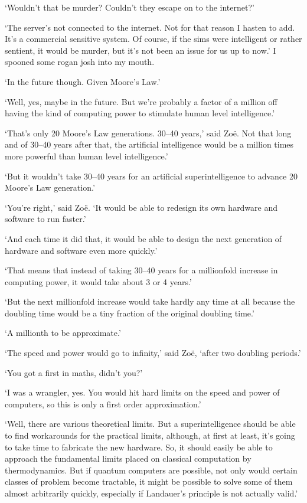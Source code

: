 `Wouldn't that be murder? Couldn't they escape on to the
internet?'

`The server's not connected to the internet. Not for that reason I
hasten to add. It's a commercial sensitive system. Of course, if the
sims were intelligent or rather sentient, it would be murder, but
it's not been an issue for us up to now.' I spooned some rogan josh
into my mouth.

`In the future though. Given Moore's Law.'

`Well, yes, maybe in the future. But we're probably a factor of a
million off having the kind of computing power to stimulate human
level intelligence.'

`That's only 20 Moore's Law generations.
30--40 years,' said Zoë. Not that long and of 30--40 years
after that, the artificial intelligence would be a million times
more powerful than human level intelligence.'

`But it wouldn't take 30--40 years for an artificial
superintelligence to advance 20 Moore's Law generation.'

`You're right,' said Zoë. `It would be able to redesign its
own hardware and software to run faster.'

`And each time it did that, it would be able to design the next
generation of hardware and software even more quickly.'

`That means that instead of taking 30--40 years for a millionfold increase in
computing power, it would take about 3 or 4 years.'

`But the next millionfold increase would take hardly any time at all
because the doubling time would be a tiny fraction of the original
doubling time.'

`A millionth to be approximate.'

`The speed and power would go to infinity,' said Zoë,
`after two doubling periods.'

`You got a first in maths, didn't you?'

`I was a wrangler, yes. You would hit hard limits on the
speed and power of computers, so this is only a first order approximation.'

`Well, there are various theoretical limits. But a superintelligence
should be able to find workarounds for the practical limits,
although, at first at least, it's going to take time to fabricate
the new hardware. So, it should easily be able to approach the
fundamental limits placed on classical computation by
thermodynamics. But if quantum computers are possible, not only
would certain classes of problem become tractable, it might be
possible to solve some of them almost arbitrarily quickly, especially if Landauer's principle is not actually valid.'

